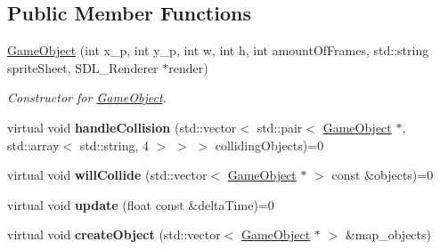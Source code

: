 \subsection*{Public Member Functions}
\begin{DoxyCompactItemize}
\item 
\hyperlink{class_game_object_a20572b6ae69d08069628c089cf443579}{Game\+Object} (int x\+\_\+p, int y\+\_\+p, int w, int h, int amount\+Of\+Frames, std\+::string sprite\+Sheet, S\+D\+L\+\_\+\+Renderer $\ast$render)
\begin{DoxyCompactList}\small\item\em Constructor for \hyperlink{class_game_object}{Game\+Object}. \end{DoxyCompactList}\item 
\hypertarget{class_game_object_a7acc9f88334654fefe7c8af8be0c49cf}{}virtual void {\bfseries handle\+Collision} (std\+::vector$<$ std\+::pair$<$ \hyperlink{class_game_object}{Game\+Object} $\ast$, std\+::array$<$ std\+::string, 4 $>$ $>$ $>$ colliding\+Objects)=0\label{class_game_object_a7acc9f88334654fefe7c8af8be0c49cf}

\item 
\hypertarget{class_game_object_a27ab44c46dedfd391e439bddd13fdb75}{}virtual void {\bfseries will\+Collide} (std\+::vector$<$ \hyperlink{class_game_object}{Game\+Object} $\ast$ $>$ const \&objects)=0\label{class_game_object_a27ab44c46dedfd391e439bddd13fdb75}

\item 
\hypertarget{class_game_object_a11b8c66b3432576a77c50a8dc67ca95b}{}virtual void {\bfseries update} (float const \&delta\+Time)=0\label{class_game_object_a11b8c66b3432576a77c50a8dc67ca95b}

\item 
\hypertarget{class_game_object_a113b5e4d1e22c04b6f72c191286bd4f7}{}virtual void {\bfseries create\+Object} (std\+::vector$<$ \hyperlink{class_game_object}{Game\+Object} $\ast$ $>$ \&map\+\_\+objects)\label{class_game_object_a113b5e4d1e22c04b6f72c191286bd4f7}


\end{DoxyCompactItemize}
